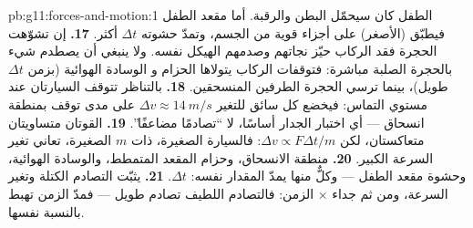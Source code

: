 \begin{solution}{pb:g11:forces-and-motion:1}
الطفل كان سيحمّل البطن والرقبة. أما مقعد الطفل فيطبّق
 (الأصغر) على أجزاء قوية من الجسم، وتمدّ حشوته
$\Delta t$ أكثر.
\textbf{17.} إن تشوّهت الحجرة فقد الركاب حيّز
نجاتهم وصدمهم الهيكل نفسه. ولا ينبغي أن يصطدم شيء
بالحجرة الصلبة مباشرة: فتوقفات الركاب يتولاها الحزام و
الوسادة الهوائية (بزمن $\Delta t$ طويل)، بينما ترسي الحجرة الطرفين المنسحقين.
\textbf{18.} بالتناظر تتوقف السيارتان عند مستوي التماس: فيخضع كل
سائق للتغير $\Delta v \approx \qty{14}{m/s}$ على مدى توقف بمنطقة
انسحاق --- أي اختبار الجدار أساسًا، لا ``تصادمًا مضاعفًا''.
\textbf{19.} القوتان متساويتان متعاكستان، لكن
$\Delta v \propto F\Delta t/m$: فالسيارة الصغيرة، ذات $m$ الصغيرة،
تعاني تغير السرعة الكبير.
\textbf{20.} منطقة الانسحاق، وحزام المقعد المتمطط، والوسادة الهوائية، وحشوة
مقعد الطفل --- وكلٌّ منها يمدّ المقدار نفسه: $\Delta t$.
\textbf{21.} يثبّت التصادم الكتلة وتغير السرعة، ومن ثم
جداء  $\times$ الزمن: فالتصادم اللطيف تصادم طويل ---
فمدّ الزمن تهبط  بالنسبة نفسها.
\end{solution}
